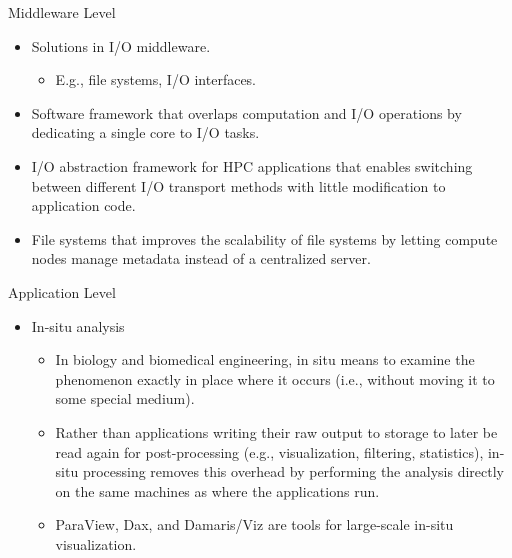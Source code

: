 \documentclass[compress,11pt,xcolor=svgnames,aspectratio=169]{beamer}
\begin{document}
\begin{frame}[t]{Middleware Level}

\begin{itemize}
\setlength\itemsep{0.4cm}

\item Solutions in I/O middleware.

    \begin{itemize}

    \item E.g., file systems, I/O interfaces.

    \end{itemize}

\item Software framework that overlaps computation and I/O operations by dedicating a single core to I/O tasks.

\item I/O abstraction framework for HPC applications that enables switching between different I/O transport methods with little modification to application code.

\item File systems that improves the scalability of file systems by letting compute nodes manage metadata instead of a centralized server.

\end{itemize}

\end{frame}

\begin{frame}[t]{Application Level}

\begin{itemize}

\item In-situ analysis\\[0.4cm]

    \begin{itemize}
    \setlength\itemsep{0.6cm}

    \item In biology and biomedical engineering, in situ means to examine the phenomenon exactly in place where it occurs (i.e., without moving it to some special medium).

    \item Rather than applications writing their raw output to storage to later be read again for post-processing (e.g., visualization, filtering, statistics), in-situ processing removes this overhead by performing the analysis directly on the same machines as where the applications run.

    \item ParaView, Dax, and Damaris/Viz are tools for large-scale in-situ visualization.

    \end{itemize}

\end{itemize}

\end{frame}
\end{document}
